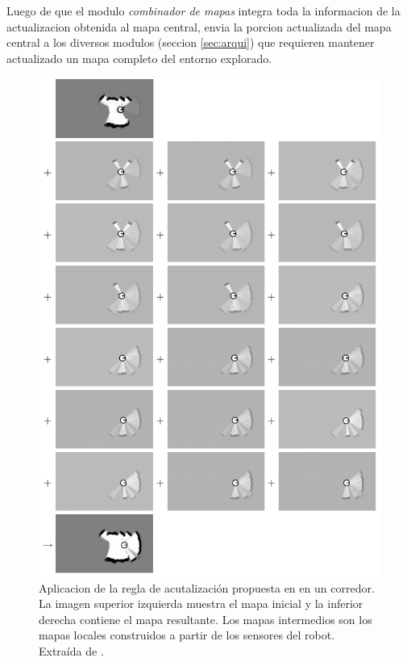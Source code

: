 Luego de que el modulo \emph{combinador de mapas} integra toda la informacion
de la actualizacion obtenida al mapa central, envia la porcion actualizada del
mapa central a los diversos modulos (seccion \ref{sec:arqui}) que requieren
mantener actualizado un mapa completo del entorno explorado.

\begin{figure}[H]
  \center
  \includegraphics[width=0.95\linewidth]{imagenes/occgridUpdate.png}
  \caption[Aplicacion de la regla de acutalización propuesta en
  \cite{stachniss2009robotic} en un corredor.]{Aplicacion de la
    regla de acutalización propuesta en \cite{stachniss2009robotic} en un
    corredor. La imagen superior izquierda muestra el mapa inicial y
    la inferior derecha contiene el mapa resultante. Los mapas intermedios son los
    mapas locales construidos a partir de los sensores del robot. Extraída de
  \cite{stachniss2009robotic}. }
  \label{fig:mappingUpRule}
\end{figure} 



